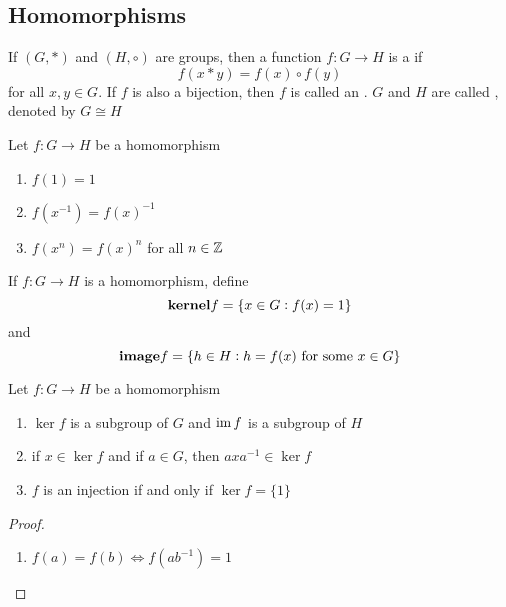 \documentclass[11pt]{article}
\begin{document}
\subsection{Homomorphisms}
\label{sec:org955d913}
\begin{definition}[]
If \((G,*)\) and \((H,\circ)\) are groups, then a function \(f:G\to H\) is a
 if
\begin{equation*}
f(x*y)=f(x)\circ f(y)
\end{equation*}
for all \(x,y\in G\). If \(f\) is also a bijection, then \(f\) is called an
. \(G\) and \(H\) are called , denoted by \(G\cong H\)
\end{definition}

\begin{lemma}[]
Let \(f:G\to H\) be a homomorphism
\begin{enumerate}
\item \(f(1)=1\)
\item \(f(x^{-1})=f(x)^{-1}\)
\item \(f(x^n)=f(x)^n\) for all \(n\in\mathbb{Z}\)
\end{enumerate}
\end{lemma}

\begin{definition}[]
If \(f:G\to H\) is a homomorphism, define
\begin{equation*}
\textbf{kernel}f=\{x\in G:f(x)=1\}
\end{equation*}
and
\begin{equation*}
\textbf{image}f=\{h\in H:h=f(x)\text{ for some } x\in G\}
\end{equation*}
\end{definition}

\begin{proposition}[]
Let \(f:G\to H\) be a homomorphism
\begin{enumerate}
\item \(\ker f\) is a subgroup of \(G\) and \(\operatorname{im} f\) is a subgroup of \(H\)
\item if \(x\in\ker f\) and if \(a\in G\), then \(axa^{-1}\in\ker f\)
\item \(f\) is an injection if and only if \(\ker f=\{1\}\)
\end{enumerate}
\end{proposition}

\begin{proof}
\begin{enumerate}
\item \(f(a)=f(b)\Leftrightarrow f(ab^{-1})=1\)
\end{enumerate}
\end{proof}
\end{document}
